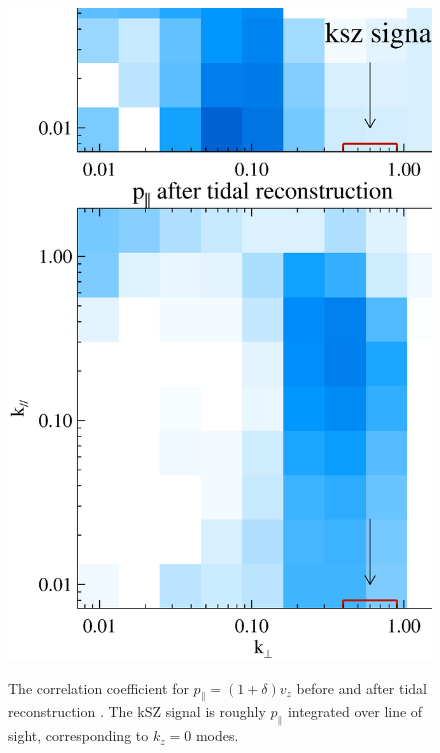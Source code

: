 \begin{figure}[btp]
\begin{minipage}[t]{0.33\linewidth}
\label{fig:v}
\end{minipage}
\begin{minipage}[t]{0.33\linewidth}
\begin{center}
\includegraphics[width=\textwidth,height=1.7\textwidth]{figure/powmomen_before_after_tide.eps}
\end{center}
\vspace{-0.7cm}
\label{fig:p}
\caption{The correlation coefficient for $p_\parallel=(1+\delta)v_z$ before and 
after tidal reconstruction . The kSZ signal is roughly $p_\parallel$ integrated over line of sight, 
corresponding to $k_z=0$ modes. }
\end{minipage}
\end{figure}
